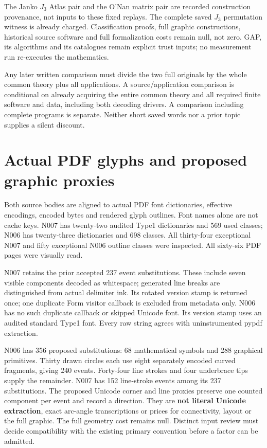 \documentclass[11pt,a4paper]{article}
\begin{document}
The Janko $J_3$ Atlas pair and the O'Nan matrix pair are recorded construction provenance, not inputs to these fixed replays. The complete saved $J_3$ permutation witness is already charged. Classification proofs, full graphic constructions, historical source software and full formalization costs remain null, not zero. GAP, its algorithms and its catalogues remain explicit trust inputs; no measurement run re-executes the mathematics.

Any later written comparison must divide the two full originals by the whole common theory plus all applications. A source/application comparison is conditional on already acquiring the entire common theory and all required finite software and data, including both decoding drivers. A comparison including complete programs is separate. Neither short saved words nor a prior topic supplies a silent discount.
\newpage
\section*{Actual PDF glyphs and proposed graphic proxies}
Both source bodies are aligned to actual PDF font dictionaries, effective encodings, encoded bytes and rendered glyph outlines. Font names alone are not cache keys. N007 has twenty-two audited Type1 dictionaries and 569 used classes; N006 has twenty-three dictionaries and 698 classes. All thirty-four exceptional N007 and fifty exceptional N006 outline classes were inspected. All sixty-six PDF pages were visually read.

N007 retains the prior accepted 237 event substitutions. These include seven visible components decoded as whitespace; generated line breaks are distinguished from actual delimiter ink. Its rotated version stamp is returned once; one duplicate Form visitor callback is excluded from metadata only. N006 has no such duplicate callback or skipped Unicode font. Its version stamp uses an audited standard Type1 font. Every raw string agrees with uninstrumented pypdf extraction.

N006 has 356 proposed substitutions: 68 mathematical symbols and 288 graphical primitives. Thirty drawn circles each use eight separately encoded curved fragments, giving 240 events. Forty-four line strokes and four underbrace tips supply the remainder. N007 has 152 line-stroke events among its 237 substitutions. The proposed Unicode corner and line proxies preserve one counted component per event and record a direction. They are \textbf{not literal Unicode extraction}, exact arc-angle transcriptions or prices for connectivity, layout or the full graphic. The full geometry cost remains null. Distinct input review must decide compatibility with the existing primary convention before a factor can be admitted.
\end{document}
